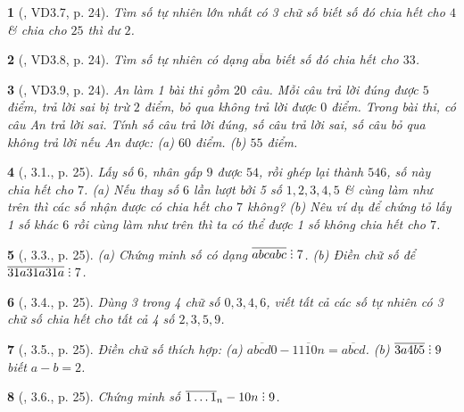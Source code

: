 \documentclass{article}
\newtheorem{baitoan}{}
\DeclareRobustCommand{\divby}{%
	\mathrel{\vbox{\baselineskip.65ex\lineskiplimit0pt\hbox{.}\hbox{.}\hbox{.}}}%
}
\begin{document}
\begin{baitoan}[\cite{TLCT_THCS_Toan_6_so_hoc}, VD3.7, p. 24]
	Tìm số tự nhiên lớn nhất có 3 chữ số biết số đó chia hết cho $4$ \& chia cho $25$ thì dư $2$.
\end{baitoan}

\begin{baitoan}[\cite{TLCT_THCS_Toan_6_so_hoc}, VD3.8, p. 24]
	Tìm số tự nhiên có dạng $\overline{aba}$ biết số đó chia hết cho $33$.
\end{baitoan}

\begin{baitoan}[\cite{TLCT_THCS_Toan_6_so_hoc}, VD3.9, p. 24]
	An làm 1 bài thi gồm $20$ câu. Mỗi câu trả lời đúng được $5$ điểm, trả lời sai bị trừ $2$ điểm, bỏ qua không trả lời được $0$ điểm. Trong bài thi, có câu An trả lời sai. Tính số câu trả lời đúng, số câu trả lời sai, số câu bỏ qua không trả lời nếu An được: (a) $60$ điểm. (b) $55$ điểm.
\end{baitoan}

\begin{baitoan}[\cite{TLCT_THCS_Toan_6_so_hoc}, 3.1., p. 25]
	Lấy số $6$, nhân gấp $9$ được $54$, rồi ghép lại thành $546$, số này chia hết cho $7$. (a) Nếu thay số $6$ lần lượt bởi 5 số $1,2,3,4,5$ \& cùng làm như trên thì các số nhận được có chia hết cho $7$ không? (b) Nêu ví dụ để chứng tỏ lấy 1 số khác $6$ rồi cùng làm như trên thì ta có thể được 1 số không chia hết cho $7$.
\end{baitoan}

\begin{baitoan}[\cite{TLCT_THCS_Toan_6_so_hoc}, 3.3., p. 25]
	(a) Chứng minh số có dạng $\overline{abcabc}\divby7$. (b) Điền chữ số để $\overline{31a31a31a}\divby7$.
\end{baitoan}

\begin{baitoan}[\cite{TLCT_THCS_Toan_6_so_hoc}, 3.4., p. 25]
	Dùng 3 trong 4 chữ số $0,3,4,6$, viết tất cả các số tự nhiên có 3 chữ số chia hết cho tất cả 4 số $2,3,5,9$.
\end{baitoan}

\begin{baitoan}[\cite{TLCT_THCS_Toan_6_so_hoc}, 3.5., p. 25]
	Điền chữ số thích hợp: (a) $\overline{abcd0} - \overline{1110n} = \overline{abcd}$. (b) $\overline{3a4b5}\divby9$ biết $a - b = 2$.
\end{baitoan}

\begin{baitoan}[\cite{TLCT_THCS_Toan_6_so_hoc}, 3.6., p. 25]
	Chứng minh số $\overline{1\ldots1}_n - 10n\divby9$.
\end{baitoan}
\end{document}
